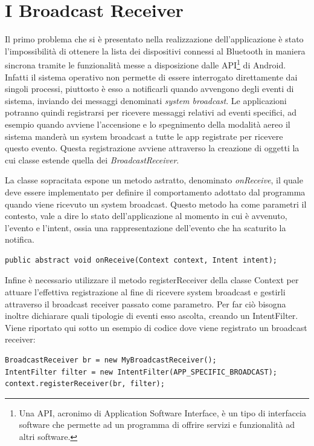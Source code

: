 \section{I Broadcast Receiver}
Il primo problema che si è presentato nella realizzazione dell'applicazione è stato l'impossibilità di ottenere la lista dei dispositivi connessi al Bluetooth in maniera sincrona tramite le funzionalità messe a disposizione dalle API\footnote{Una API, acronimo di Application Software Interface, è un tipo di interfaccia software che permette ad un programma di offrire servizi e funzionalità ad altri software.} di Android. Infatti il sistema operativo non permette di essere interrogato direttamente dai singoli processi, piuttosto è esso a notificarli quando avvengono degli eventi di sistema, inviando dei messaggi denominati \textit{system broadcast}. Le applicazioni potranno quindi registrarsi per ricevere messaggi relativi ad eventi specifici, ad esempio quando avviene l'accensione e lo spegnimento della modalità aereo il sistema manderà un system broadcast a tutte le app registrate per ricevere questo evento. Questa registrazione avviene attraverso la creazione di oggetti la cui classe estende quella dei \textit{BroadcastReceiver}.\cite{ref:android-broadcast}

La classe sopracitata espone un metodo astratto, denominato \textit{onReceive}, il quale deve essere implementato per definire il comportamento adottato dal programma quando viene ricevuto un system broadcast. Questo metodo ha come parametri il contesto, vale a dire lo stato dell'applicazione al momento in cui è avvenuto, l'evento e l'intent, ossia una rappresentazione dell'evento che ha scaturito la notifica.

\begin{verbatim}
public abstract void onReceive(Context context, Intent intent);
\end{verbatim}

Infine è necessario utilizzare il metodo registerReceiver della classe Context per attuare l'effettiva registrazione al fine di ricevere system broadcast e gestirli attraverso il broadcast receiver passato come parametro. Per far ciò bisogna inoltre dichiarare quali tipologie di eventi esso ascolta, creando un IntentFilter. Viene riportato qui sotto un esempio di codice dove viene registrato un broadcast receiver:
\begin{verbatim}
BroadcastReceiver br = new MyBroadcastReceiver();
IntentFilter filter = new IntentFilter(APP_SPECIFIC_BROADCAST);
context.registerReceiver(br, filter);
\end{verbatim}

